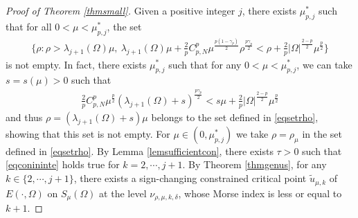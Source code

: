 \documentclass[10pt,a4paper]{amsart}
\newcommand{\ga}{\gamma}
\newcommand{\la}{\lambda}
\begin{document}
\begin{proof}[Proof of Theorem \ref{thmsmall}]
Given a positive integer $j$, there exists $\mu^*_{p,j}$ such that for all $0 < \mu < \mu^*_{p,j}$, the set
\begin{align} \label{eqsetrho}
	\biggl\{\rho: \rho > \la_{j+1}(\Omega)\mu, \ \la_{j+1}(\Omega)\mu + \frac2p C_{p,N}^p \mu^{\frac{p(1-\ga_p)}{2}}\rho ^{\frac{p\ga_p}{2}} < \rho + \frac2p |\Omega|^{\frac{2-p}{2}}\mu^{\frac p2}\biggr\}
\end{align}
is not empty. In fact, there exists $\mu^*_{p,j}$ such that for any $0 < \mu < \mu^*_{p,j}$, we can take $s = s(\mu) > 0$ such that
\begin{align*}
	\frac2p C_{p,N}^p \mu^{\frac{p}{2}}(\la_{j+1}(\Omega) + s) ^{\frac{p\ga_p}{2}} < s\mu + \frac2p |\Omega|^{\frac{2-p}{2}}\mu^{\frac p2}
\end{align*}
and thus $\rho = (\la_{j+1}(\Omega) + s)\mu$ belongs to the set defined in \eqref{eqsetrho}, showing that this set is not empty. For $\mu \in (0,\mu^*_{p,j})$ we take $\rho = \rho_\mu$ in the set defined in \eqref{eqsetrho}. By Lemma \ref{lemsufficientcon}, there exists $\tau > 0$ such that \eqref{eqconininte} holds true for $k = 2,\cdots,j+1$. By Theorem \ref{thmgenus}, for any $k \in \{2,\cdots,j+1\}$, there exists a sign-changing constrained critical point $\tilde u_{\mu,k}$ of $E(\cdot,\Omega)$ on $S_\mu(\Omega)$ at the level $\nu_{\rho,\mu,k,\delta}$, whose Morse index is less or equal to $k+1$.


\end{proof}
\end{document}
